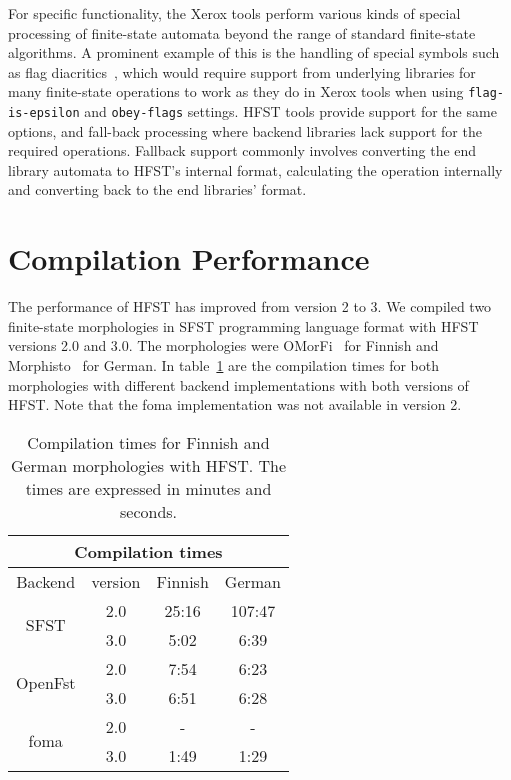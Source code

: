 \documentclass{llncs}
\begin{document}
For specific functionality, the Xerox tools perform various kinds of special
processing of finite-state automata beyond the range of standard finite-state
algorithms. A prominent example of this is the handling of special symbols such
as flag diacritics~\cite{beesley/1998}, which would require support from
underlying libraries for many finite-state operations to work as they do in
Xerox tools when using \texttt{flag-is-epsilon} and \texttt{obey-flags}
settings. HFST tools provide support for the same options, and
fall-back processing where backend libraries lack support for the
required operations. Fallback support commonly involves converting the end
library automata to HFST's internal format, calculating the operation
internally and converting back to the end libraries' format. 

\section{Compilation Performance}

The performance of HFST has improved from version 2 to 3. 
We compiled two finite-state morphologies in SFST programming language format
with HFST versions 2.0 and 3.0. 
The morphologies were OMorFi~\cite{pirinen/2008} for Finnish and 
Morphisto~\cite{zielinski/2009} for German.
In table~\ref{tab:compilation_times} are the compilation times 
for both morphologies with 
different backend implementations with both versions of HFST. 
Note that the foma implementation was not available in version 2.

\begin{table}
\centering
  \begin{tabular}{ c | c | c | c }
  \multicolumn{4}{c}{Compilation times} \\ \hline
  Backend & version & Finnish & German \\ \hline
  \multirow{2}{*}{SFST} & 2.0 & 25:16 & 107:47 \\
  & 3.0 & 5:02 & 6:39 \\ \hline
  \multirow{2}{*}{OpenFst} & 2.0 & 7:54 & 6:23 \\
  & 3.0 & 6:51 & 6:28 \\ \hline
  \multirow{2}{*}{foma} & 2.0 & - & - \\
  & 3.0 & 1:49 & 1:29 \\
  \end{tabular}
  \caption{Compilation times for Finnish and German morphologies with
    HFST. The times are expressed in minutes and seconds.}
  \label{tab:compilation_times}
\end{table}
\end{document}
